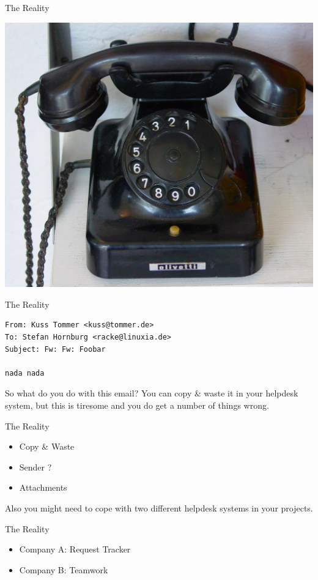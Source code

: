 \begin{frame}{The Reality}
\begin{center}
  \includegraphics[width=\textwidth,height=1\textheight,keepaspectratio]{pics/phone.jpg}
\end{center}
\end{frame}

\begin{frame}[fragile]{The Reality}
\begin{lstlisting}
From: Kuss Tommer <kuss@tommer.de>
To: Stefan Hornburg <racke@linuxia.de>
Subject: Fw: Fw: Foobar

nada nada
\end{lstlisting}
\end{frame}

So what do you do with this email? You can copy \& waste it in your
helpdesk system, but this is tiresome and you do get a number of
things wrong.

\begin{frame}{The Reality}
\begin{itemize}
\item Copy \& Waste
\item Sender ?
\item Attachments
\end{itemize}
\end{frame}

Also you might need to cope with two different helpdesk systems
in your projects.

\begin{frame}{The Reality}
\begin{itemize} 
\item Company A: Request Tracker
\item Company B: Teamwork
\end{itemize}
\end{frame}

